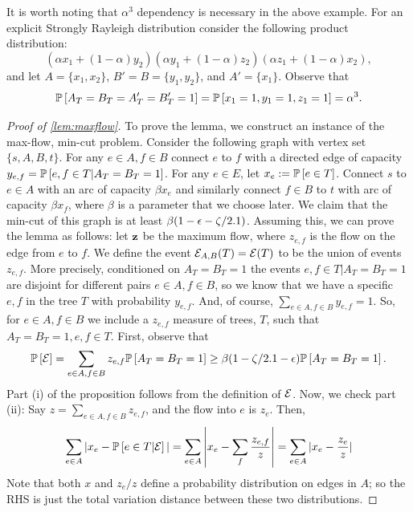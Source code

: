 It is worth noting that $\alpha^3$ dependency is necessary in the above example. For an explicit Strongly Rayleigh distribution consider the following product distribution:
	$$ (\alpha x_1 + (1-\alpha)y_2) (\alpha y_1 + (1-\alpha) z_2)(\alpha z_1 + (1-\alpha)x_2),$$
	and let $A=\{x_1,x_2\}$, $B'=B=\{y_1,y_2\}$, and $A'=\{x_1\}$.
	Observe that 
	$$\P{A_T=B_T=A'_T=B'_T=1} = \P{x_1=1,y_1=1,z_1=1}=\alpha^3.$$



\begin{proof}[Proof of \cref{lem:maxflow}]
	To prove the lemma, we construct an instance of the max-flow, min-cut problem. Consider the following graph with vertex set $\{s,A,B,t\}$. For any $e\in A, f\in B$ connect $e$ to $f$ with a directed edge of capacity $y_{e,f}=\P{e,f\in T| A_T=B_T=1}$. 
	For any $e \in E$, let $x_e := \P{e \in T}$. Connect $s$ to $e\in A$ with an arc of capacity $\beta x_e$ and similarly connect $f\in B$ to $t$ with arc of capacity $\beta x_f$, where $\beta$ is a parameter that we choose later. We claim that the min-cut of this graph is at least $\beta(1-\eps-\zeta/2.1)$. Assuming this, we can prove the lemma as follows: let $\bf{z}$ be the maximum flow, where $z_{e,f}$ is the flow on the edge from $e$ to $f$. We define the event $\cE_{A,B}(T) = \cE(T)$ to be the union of events $z_{e,f}$. More precisely, conditioned on $A_T=B_T=1$ the events $e,f\in T | A_T=B_T=1$ are disjoint for different pairs $e\in A, f\in B$, so we know that we  have a specific $e,f$ in the tree $T$ with probability $y_{e,f}$. And, of course, $\sum_{e\in A,f\in B} y_{e,f}=1$. So, for $e\in A, f\in B$ we include a $z_{e,f}$ measure of trees, $T$, such that $A_T=B_T=1, e,f\in T$.
		First, observe that  
		\begin{equation}
		\label{cEdefn}	
		\P{\cE}=\sum_{e\in A,f\in B} z_{e,f} \P{A_T=B_T=1}\geq \beta(1-\zeta/2.1-\eps)\P{A_T=B_T=1}.
		\end{equation}
		Part (i) of the proposition follows from the definition of $\cE$. Now, we check part (ii): Say  $z=\sum_{e\in A,f\in B} z_{e,f}$, and the flow into $e$ is $z_e$. Then,
		$$ \sum_{e\in A} |x_e-\P{e\in T | \cE}|=\sum_{e\in A} \left|x_e - \sum_f \frac{z_{e,f}}{z}\right| = \sum_{e\in A} |x_e -\frac{z_e}{z}|  $$
		Note that both $x$ and $z_e/z$ define a probability distribution on edges in $A$; so the RHS is just the total variation distance between these two distributions. 

\end{proof}
